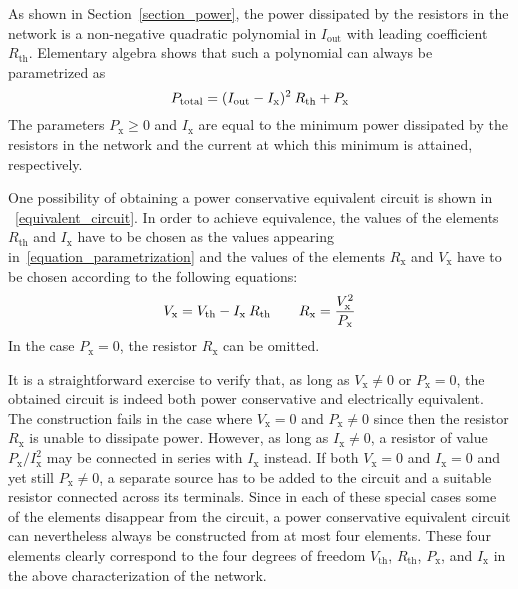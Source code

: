 \documentclass[twoside]{IEEEtran}
\newcommand{\mult}{\nonscript\:}
\newcommand{\opout}{{\operatorname{out}}}
\newcommand{\opth}{{\operatorname{th}}}
\newcommand{\optotal}{{\operatorname{total}}}
\newcommand{\opx}{{\operatorname{x}}}
\begin{document}
As shown in Section~\ref{section_power}, the power dissipated by the resistors in the network is a non-negative quadratic polynomial in $I_{\opout}$ with leading coefficient $R_{\opth}$.
Elementary algebra shows that such a polynomial can always be parametrized as
\begin{equation}
    P_{\optotal}
  = (I_{\opout} - I_{\opx})^{2} \mult R_{\opth} + P_{\opx}
  \label{equation_parametrization}
\end{equation}
The parameters $P_{\opx} \ge 0$ and $I_{\opx}$ are equal to the minimum power dissipated by the resistors in the network and the current at which this minimum is attained, respectively.

One possibility of obtaining a power conservative equivalent circuit is shown in \figurename~\ref{equivalent_circuit}.
In order to achieve equivalence, the values of the elements $R_{\opth}$ and $I_{\opx}$ have to be chosen as the values appearing in~\eqref{equation_parametrization} and the values of the elements $R_{\opx}$ and $V_{\opx}$ have to be chosen according to the following equations:
\begin{displaymath}
    V_{\opx}
  = V_{\opth} - I_{\opx} \mult R_{\opth}
  \qquad
    R_{\opx}
  = \frac{V_{\opx}^{2}}{P_{\opx}}
\end{displaymath}
In the case $P_{\opx} = 0$, the resistor $R_{\opx}$ can be omitted.

It is a straightforward exercise to verify that, as long as $V_{\opx} \ne 0$ or $P_{\opx} = 0$, the obtained circuit is indeed both power conservative and electrically equivalent.
The construction fails in the case where $V_{\opx} = 0$ and $P_{\opx} \ne 0$ since then the resistor $R_{\opx}$ is unable to dissipate power.
However, as long as $I_{\opx} \ne 0$, a resistor of value $P_{\opx} / I_{\opx}^{2}$ may be connected in series with $I_{\opx}$ instead.
If both $V_{\opx} = 0$ and $I_{\opx} = 0$ and yet still $P_{\opx} \ne 0$, a separate source has to be added to the circuit and a suitable resistor connected across its terminals.
Since in each of these special cases some of the elements disappear from the circuit, a power conservative equivalent circuit can nevertheless always be constructed from at most four elements.
These four elements clearly correspond to the four degrees of freedom $V_{\opth}$, $R_{\opth}$, $P_{\opx}$, and $I_{\opx}$ in the above characterization of the network.


\end{document}
